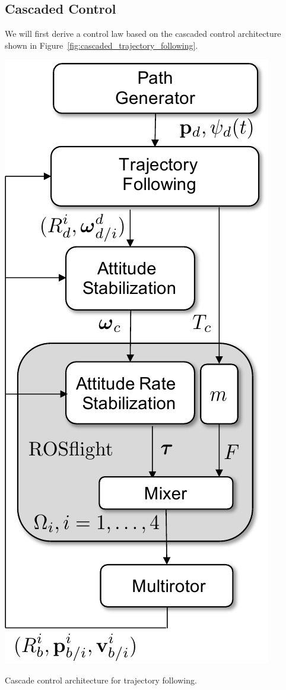 \subsection{Cascaded Control}
We will first derive a control law based on the cascaded control architecture shown in Figure~\ref{fig:cascaded_trajectory_following}.
\begin{marginfigure}[1in]
  \includegraphics[width=\linewidth]{chap4_trajectory_following/figures/cascaded_trajectory_following}
  \caption{Cascade control architecture for trajectory following.}
  \label{fig:cascaded_trajectory_following}  
\end{marginfigure}
